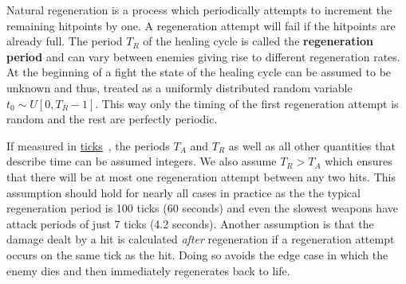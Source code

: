 Natural regeneration is a process which periodically attempts to increment the remaining hitpoints by one. A regeneration attempt will fail if the hitpoints are already full. The period $T_R$ of the healing cycle is called the \textbf{regeneration period} and can vary between enemies giving rise to different regeneration rates. At the beginning of a fight the state of the healing cycle can be assumed to be unknown and thus, treated as a uniformly distributed random variable $t_0 \sim U[0,T_R-1]$. This way only the timing of the first regeneration attempt is random and the rest are perfectly periodic.

If measured in \href{https://oldschool.runescape.wiki/w/RuneScape_clock}{ticks}~\cite{wikitick}, the periods $T_A$ and $T_R$ as well as all other quantities that describe time can be assumed integers. We also assume $T_R > T_A$ which ensures that there will be at most one regeneration attempt between any two hits. This assumption should hold for nearly all cases in practice as the the typical regeneration period is 100 ticks (60 seconds) and even the slowest weapons have attack periods of just 7 ticks (4.2 seconds). Another assumption is that the damage dealt by a hit is calculated \emph{after} regeneration if a regeneration attempt occurs on the same tick as the hit. Doing so avoids the edge case in which the enemy dies and then immediately regenerates back to life.
